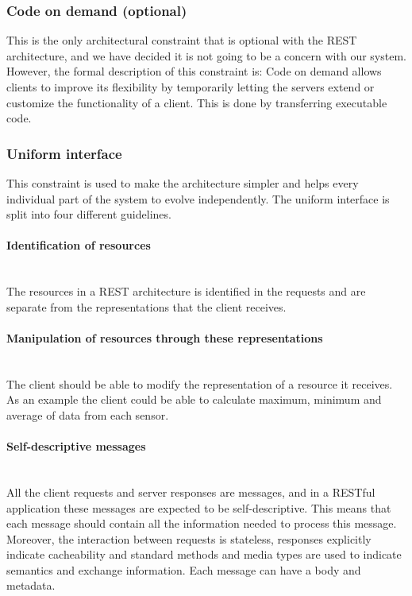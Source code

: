 \documentclass[../document.tex]{subfiles}
\begin{document}
\subsubsection{Code on demand (optional)}
This is the only architectural constraint that is optional with the REST architecture, and we have decided it is not going to be a concern with our system. However, the formal description of this constraint is: Code on demand allows clients to improve its flexibility by temporarily letting the servers extend or customize the functionality of a client. This is done by transferring executable code.

\subsubsection{Uniform interface}
This constraint is used to make the architecture simpler and helps every individual part of the system to evolve independently. The uniform interface is split into four different guidelines.

\paragraph{Identification of resources} \ \\
The resources in a REST architecture is identified in the requests and are separate from the representations that the client receives. 

\paragraph{Manipulation of resources through these representations} \ \\
The client should be able to modify the representation of a resource it receives. As an example the client could be able to calculate maximum, minimum and average of data from each sensor. 

\paragraph{Self-descriptive messages} \ \\
All the client requests and server responses are messages, and in a RESTful application these messages are expected to be self-descriptive. This means that each message should contain all the information needed to process this message. Moreover, the interaction between requests is stateless, responses explicitly indicate cacheability and standard methods and media types are used to indicate semantics and exchange information. Each message can have a body and metadata.
\end{document}

